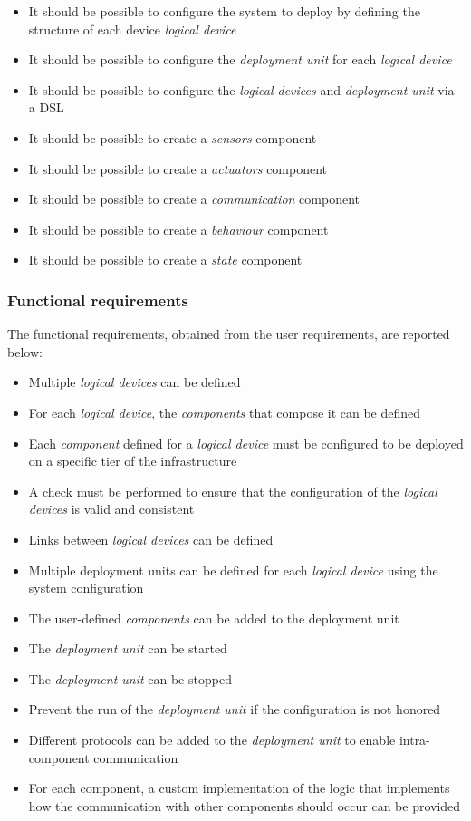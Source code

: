 \begin{itemize}
	\item It should be possible to configure the system to deploy by defining the structure of each device \emph{logical device}
	\item It should be possible to configure the \emph{deployment unit} for each \emph{logical device}
	\item It should be possible to configure the \emph{logical devices} and \emph{deployment unit} via a DSL
	\item It should be possible to create a \emph{sensors} component
	\item It should be possible to create a \emph{actuators} component
	\item It should be possible to create a \emph{communication} component
	\item It should be possible to create a \emph{behaviour} component
	\item It should be possible to create a \emph{state} component
\end{itemize}

\subsubsection{Functional requirements}
\label{sec:functional-requirements}

The functional requirements, obtained from the user requirements, are reported below:

\begin{itemize}
	\item Multiple \emph{logical devices} can be defined
	\item For each \emph{logical device}, the \emph{components} that compose it can be defined
	\item Each \emph{component} defined for a \emph{logical device} must be configured to be deployed on a specific tier of the infrastructure
	\item A check must be performed to ensure that the configuration of the \emph{logical devices} is valid and consistent
	\item Links between \emph{logical devices} can be defined
	\item Multiple deployment units can be defined for each \emph{logical device} using the system configuration
	\item The user-defined \emph{components} can be added to the deployment unit
	\item The \emph{deployment unit} can be started
	\item The \emph{deployment unit} can be stopped
	\item Prevent the run of the \emph{deployment unit} if the configuration is not honored
	\item Different protocols can be added to the \emph{deployment unit} to enable intra-component communication
	\item For each component, a custom implementation of the logic that implements how the communication with other components should occur can be
	      provided
\end{itemize}

